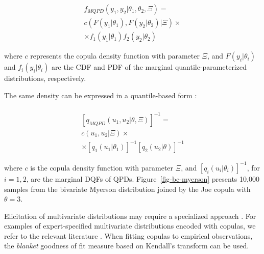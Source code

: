 \documentclass[
  fleqn,
  deca,
  blindrev
]{informs4}
\begin{document}
\[
\begin{gathered}
f_{MQPD}(y_1,y_2\vert \theta_1,\theta_2,\Xi)=\\
c(F(y_1\vert\theta_1),F(y_2\vert\theta_2)\vert\Xi)\times \\
\times f_1\left(y_1\vert\theta_1\right) f_2\left(y_2\vert\theta_2\right)
\end{gathered}
\]

where \(c\) represents the copula density function with parameter
\(\Xi\), and \(F(y_i\vert\theta_i)\) and \(f_i(y_i\vert\theta_i)\) are
the CDF and PDF of the marginal quantile-parameterized distributions,
respectively.

The same density can be expressed in a quantile-based form
\citep{perepolkin2023TenetsQuantilebasedInference}:

\[
\begin{gathered}\\
[q_{MQPD}(u_1,u_2\vert\theta, \Xi)]^{-1}=\\
c\left(u_1,u_2\vert\Xi\right)\times \\
\times [q_1(u_1\vert\theta_1)]^{-1}[q_2(u_2\vert\theta)]^{-1}
\end{gathered}
\]

where \(c\) is the copula density function with parameter \(\Xi\), and
\([q_i(u_i\vert\theta_i)]^{-1}\), for \(i=1,2\), are the marginal DQFs
of QPDs. Figure~\ref{fig-bc-myerson} presents 10,000 samples from the
bivariate Myerson distribution joined by the Joe copula with
\(\theta=3\).

Elicitation of multivariate distributions may require a specialized
approach
\citep{elfadaly2017ElicitingDirichletGaussian, wilson2021RecentAdvancesElicitation}.
For examples of expert-specified multivariate distributions encoded with
copulas, we refer to the relevant literature
\citep{wilson2018SpecificationInformativePrior, holzhauer2022ElicitingJudgementsDependent, sharma2018RegularizationVariableSelection, aas2009PaircopulaConstructionsMultiple}.
When fitting copulas to empirical observations, the \emph{blanket}
goodness of fit measure \citep{wang2000ModelSelectionSemiparametric}
based on Kendall's transform
\citep{genest2006GoodnessofFitProceduresCopula, genest2009GoodnessoffitTestsCopulas}
can be used.
\end{document}

